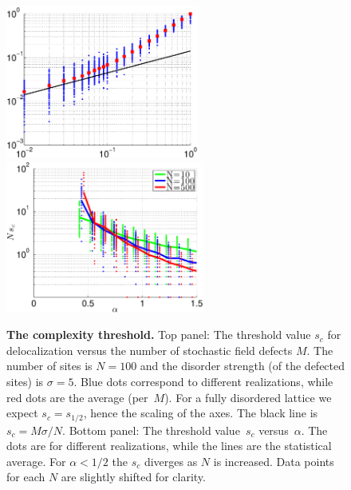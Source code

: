 \documentclass[aps,pre,floats,floatfix,twocolumn]{revtex4}
\newcommand{\Eq}[1]{\textcolor{blue}{{equation}\!~(\ref{#1})}}
\newcommand{\rmrk}[1]{{\color[rgb]{0.6,0,0.1} #1}}
\begin{document}
\begin{figure}
\includegraphics[height=5cm]{s_c_sparse_100_loglog}
\includegraphics[height=5cm]{s_c_vs_alpha}

\caption{\label{figSc}
{\bf The complexity threshold.}
%
Top panel: The threshold value $s_c$ for delocalization versus the number of stochastic field defects $M$. 
The number of sites is $N{=}100$ and the disorder strength (of the defected sites) is $\sigma{=}5$. 
Blue dots correspond to different realizations, while red dots are the average (per~$M$). 
For a fully disordered lattice we expect $s_c=s_{1/2}$, hence the scaling of the axes. 
The black line is \rmrk{ $s_c=M\sigma/N$}. %
%
Bottom panel: The threshold value~$s_c$ versus~$\alpha$. 
The dots are for different realizations, while the lines are the statistical average.  
For ${\alpha<1/2}$ the $s_c$ diverges as $N$ is increased.  
Data points for each $N$ are slightly shifted for clarity.
}
\end{figure}
\end{document}
